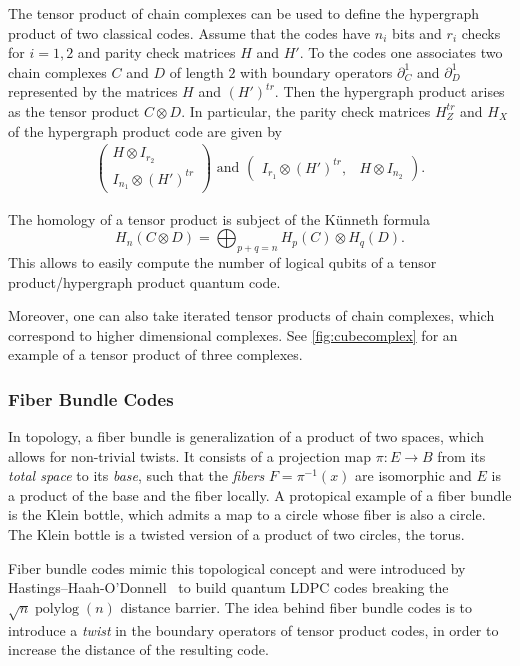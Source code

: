 \documentclass[amsmath, amssymb, floatfix, reprint, twocolumn, notitlepage, 10pt]{revtex4-1}
\newcommand{\change}{}
\begin{document}
{\change The tensor product of chain complexes can be used to define the hypergraph product of two classical codes.
Assume that the codes have $n_i$ bits and $r_i$ checks for $i=1,2$ and parity check matrices $H$ and $H'.$ 
To the codes one associates two chain complexes $C$ and $D$ of length $2$ with boundary operators $\partial_C^1$ and $\partial_D^1$ represented by the matrices $H$ and $(H')^{tr}.$ 
Then the hypergraph product arises as the tensor product $C\otimes D.$ 
In particular, the parity check matrices $H_Z^{tr}$ and $H_X$ of the hypergraph product code are given by
\begin{align*}
\begin{pmatrix} H \otimes I_{r_2}\\ I_{n_1}\otimes (H')^{tr}  \end{pmatrix}\text{ and }\begin{pmatrix}I_{r_1}\otimes(H')^{tr}, & H\otimes I_{n_2}  \end{pmatrix}.
\end{align*}}

The homology of a tensor product is subject of the Künneth formula
$$H_n(C\otimes D)=\bigoplus_{p+q=n} H_p(C)\otimes H_q(D).$$
This allows to easily compute the number of logical qubits of a tensor product/hypergraph product quantum code.

Moreover, one can also take iterated tensor products of chain complexes, which correspond to higher dimensional complexes. See \cref{fig:cubecomplex} for an example of a tensor product of three complexes.





\subsubsection{Fiber Bundle Codes}\label{app:fiberbundle}
In topology, a fiber bundle is generalization of a product of two spaces, which allows for non-trivial twists. It consists of a projection map $\pi: E\to B$ from its \emph{total space} to its \emph{base}, such that the \emph{fibers} $F=\pi^{-1}(x)$ are isomorphic and $E$ is a product of the base and the fiber locally. A protopical example of a fiber bundle is the Klein bottle, which admits a map to a circle whose fiber is also a circle. The Klein bottle is a twisted version of a product of two circles, the torus.

Fiber bundle codes mimic this topological concept and were introduced by Hastings--Haah-O'Donnell~\cite{hastings2020fiber} to build quantum LDPC codes breaking the $\sqrt{n}\operatorname{polylog}(n)$ distance barrier.
The idea behind fiber bundle codes is to introduce a \emph{twist} in the boundary operators of tensor product codes, in order to increase the distance of the resulting code. 
\end{document}
